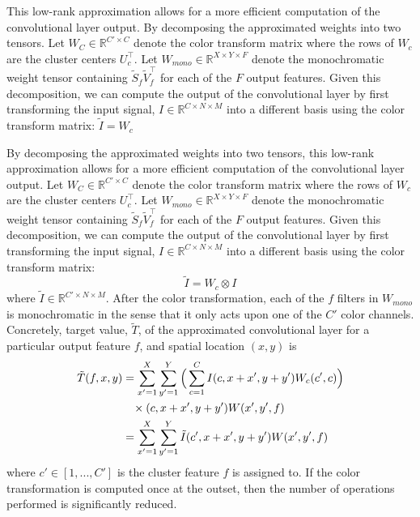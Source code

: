 This low-rank approximation allows for a more efficient computation of the convolutional layer output. By decomposing the approximated weights into two tensors. Let $W_C \in \mathbb{R}^{C' \times C}$ denote the color transform matrix where the rows of $W_c$ are the cluster centers $U_c^{\top}$. Let $W_{mono} \in \mathbb{R}^{X \times Y \times F}$ denote the monochromatic weight tensor containing $ \tilde{S}_f \tilde{V}_f^{\top}$ for each of the $F$ output features. Given this decomposition, we can compute the output of the convolutional layer by first transforming the input signal, $I \in \mathbb{R}^{C \times N \times M}$ into a different basis using the color transform matrix: $\tilde{I} = W_c $

By decomposing the approximated weights into two tensors, this low-rank approximation allows for a more efficient computation of the convolutional layer output. Let $W_C \in \mathbb{R}^{C' \times C}$ denote the color transform matrix where the rows of $W_c$ are the cluster centers $U_c^{\top}$. Let $W_{mono} \in \mathbb{R}^{X \times Y \times F}$ denote the monochromatic weight tensor containing $ \tilde{S}_f \tilde{V}_f^{\top}$ for each of the $F$ output features. Given this decomposition, we can compute the output of the convolutional layer by first transforming the input signal, $I \in \mathbb{R}^{C \times N \times M}$ into a different basis using the color transform matrix: 
\begin{equation*}
	\tilde{I} = W_c \otimes I
\end{equation*}
where $\tilde{I} \in \mathbb{R}^{C' \times N \times M}$. After the color transformation, each of the $f$ filters in $W_{mono}$ is monochromatic in the sense that it only acts upon one of the $C'$ color channels. Concretely, target value, $\tilde{T}$, of the approximated convolutional layer for a particular output feature $f$, and spatial location $(x, y)$ is
\begin{align*}
	\tilde{T}(f, x, y) &= \sum_{x' = 1}^{X} \sum_{y' = 1}^{Y} \Big(\sum_{c = 1}^{C} I(c, x + x', y + y') W_c(c', c) \Big) \\
			&\hspace{3mm} \times (c, x + x', y + y') W(x', y', f) \\
			&= \sum_{x' = 1}^{X} \sum_{y' = 1}^{Y} \tilde{I}(c', x + x', y + y') W(x', y', f)
\end{align*} 
where $c' \in [1, ..., C']$ is the cluster feature $f$ is assigned to. If the color transformation is computed once at the outset, then the number of operations performed is significantly reduced.  

